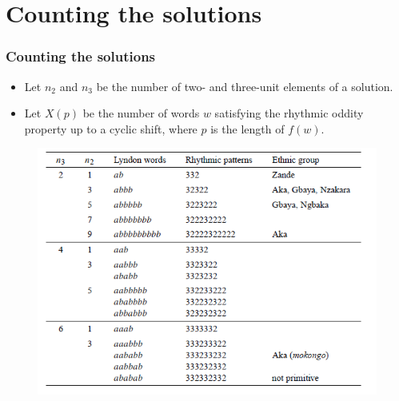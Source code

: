 \documentclass{beamer}
\theoremstyle{definition}
\begin{document}
\section{Counting the solutions}



\begin{frame}
\frametitle{Counting the solutions}
\begin{itemize}


\item
 Let $n_2$ and $n_3$ be the number of two- and three-unit
elements of a solution. 

\item<2->Let $X(p)$ be the number of words $w$ satisfying the
rhythmic oddity property up to a cyclic shift, where $p$
is the length of $f (w)$.
\end{itemize}

\end{frame}

\begin{frame}[fragile]
\begin{figure}[h!]
\includegraphics[scale=0.5]{tabla}
\end{figure}

\end{frame}
\end{document}
